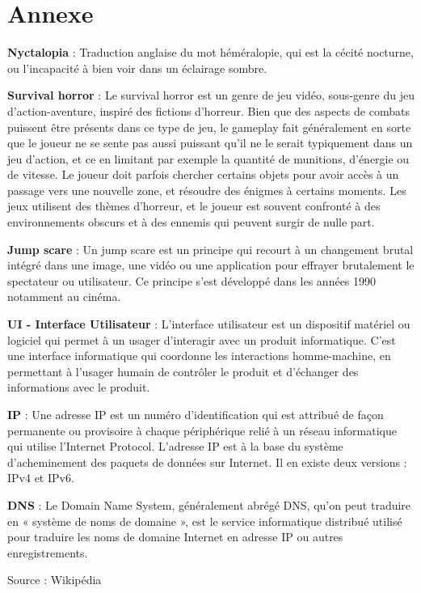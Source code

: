 \section{Annexe}

\noindent \textbf{Nyctalopia} : Traduction anglaise du mot héméralopie, qui est la cécité nocturne, ou l'incapacité à bien voir dans un éclairage sombre.

\noindent \textbf{Survival horror} : Le survival horror est un genre de jeu vidéo, sous-genre du jeu d'action-aventure, inspiré des fictions d'horreur. Bien que des aspects de combats puissent être présents dans ce type de jeu, le gameplay fait généralement en sorte que le joueur ne se sente pas aussi puissant qu'il ne le serait typiquement dans un jeu d'action, et ce en limitant par exemple la quantité de munitions, d'énergie ou de vitesse. Le joueur doit parfois chercher certains objets pour avoir accès à un passage vers une nouvelle zone, et résoudre des énigmes à certains moments. Les jeux utilisent des thèmes d'horreur, et le joueur est souvent confronté à des environnements obscurs et à des ennemis qui peuvent surgir de nulle part.

\noindent \textbf{Jump scare} : Un jump scare est un principe qui recourt à un changement brutal intégré dans une image, une vidéo ou une application pour effrayer brutalement le spectateur ou utilisateur. Ce principe s'est développé dans les années 1990 notamment au cinéma.

\noindent \textbf{UI - Interface Utilisateur} : L’interface utilisateur est un dispositif matériel ou logiciel qui permet à un usager d'interagir avec un produit informatique. C'est une interface informatique qui coordonne les interactions homme-machine, en permettant à l'usager humain de contrôler le produit et d'échanger des informations avec le produit.

\noindent \textbf{IP} : Une adresse IP est un numéro d'identification qui est attribué de façon permanente ou provisoire à chaque périphérique relié à un réseau informatique qui utilise l'Internet Protocol. L'adresse IP est à la base du système d'acheminement des paquets de données sur Internet. Il en existe deux versions : IPv4 et IPv6.

\noindent \textbf{DNS} : Le Domain Name System, généralement abrégé DNS, qu'on peut traduire en « système de noms de domaine », est le service informatique distribué utilisé pour traduire les noms de domaine Internet en adresse IP ou autres enregistrements.

\hfill Source : Wikipédia

